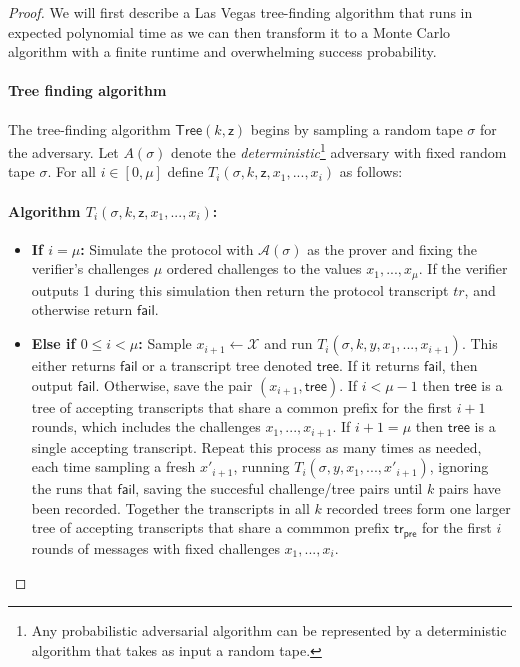 \documentclass{article}
\theoremstyle{definition}
\begin{document}
 
 \begin{proof} 
	We will first describe a Las Vegas tree-finding algorithm that runs in expected polynomial time as we can then transform it to a Monte Carlo algorithm with a finite runtime and overwhelming success probability. 

\paragraph{Tree finding algorithm} 
The tree-finding algorithm $\mathsf{Tree}(k,\mathsf{z})$ begins by sampling a random tape $\sigma$ for the adversary. Let $A(\sigma)$ denote the \emph{deterministic}\footnote{Any probabilistic adversarial algorithm can be represented by a deterministic algorithm that takes as input a random tape.} adversary with fixed random tape $\sigma$. For all $i \in [0, \mu]$ define $T_i(\sigma, k, \mathsf{z}, x_1,...,x_i)$ as follows: 

\paragraph{Algorithm $T_i(\sigma, k, \mathsf{z}, x_1,...,x_i)$:}
\begin{itemize}
\item \textbf{If $i = \mu$:} Simulate the protocol with $\mathcal{A}(\sigma)$ as the prover and fixing the verifier's challenges $\mu$ ordered challenges to the values $x_1,...,x_\mu$. If the verifier outputs 1 during this simulation then return the protocol transcript $tr$, and otherwise return $\mathsf{fail}$. 

\item \textbf{Else if $0 \leq i < \mu$:} Sample $x_{i+1} \gets \mathcal{X}$ and run $T_i(\sigma, k,y, x_1,...,x_{i+1})$. This either returns $\mathsf{fail}$ or a transcript tree denoted $\textsf{tree}$. If it returns $\mathsf{fail}$, then output $\mathsf{fail}$. Otherwise, save the pair $(x_{i+1}, \textsf{tree})$. If $i < \mu -1$ then $\textsf{tree}$ is a tree of accepting transcripts that share a common prefix for the first $i+1$ rounds, which includes the challenges $x_1,...,x_{i+1}$. If $i+1 = \mu$ then $\textsf{tree}$ is a single accepting transcript. Repeat this process as many times as needed, each time sampling a fresh $x'_{i+1}$, running $T_i(\sigma, y, x_1,...,x'_{i+1})$, ignoring the runs that $\mathsf{fail}$, saving the succesful challenge/tree pairs until $k$ pairs have been recorded. Together the transcripts in all $k$ recorded trees form one larger tree of accepting transcripts that share a commmon prefix $\textsf{tr}_\textsf{pre}$ for the first $i$ rounds of messages with fixed challenges $x_1,...,x_i$.
\end{itemize}


\end{proof}
\end{document}
